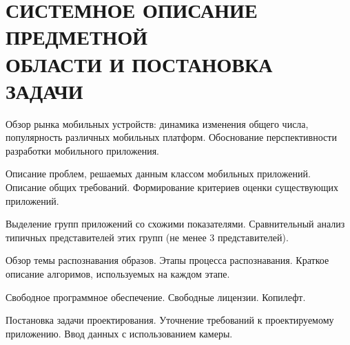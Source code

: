 \section[Системное описание предметной области и постановка задачи]{%
  СИСТЕМНОЕ ОПИСАНИЕ ПРЕДМЕТНОЙ \\
  ОБЛАСТИ И ПОСТАНОВКА ЗАДАЧИ
}

\label{sec:spec}

Обзор рынка мобильных устройств: динамика изменения общего числа,
популярность различных мобильных платформ.
Обоснование перспективности разработки мобильного приложения.

Описание проблем, решаемых данным классом мобильных приложений.
Описание общих требований.
Формирование критериев оценки существующих приложений.

Выделение групп приложений со схожими показателями. Сравнительный анализ типичных представителей этих групп (не менее 3 представителей).

Обзор темы распознавания образов.
Этапы процесса распознавания.
Краткое описание алгоримов, используемых на каждом этапе.

Свободное программное обеспечение. Свободные лицензии. Копилефт.

Постановка задачи проектирования.
Уточнение требований к проектируемому приложению. Ввод данных с использованием камеры.